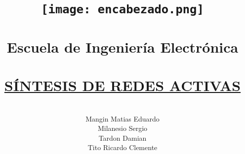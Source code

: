 \documentclass[]{article}
\title{\texttt{[image: encabezado.png]}\\
\textbf{\\Escuela de Ingeniería Electrónica}\\    
\textbf{\\\underline{SÍNTESIS DE REDES ACTIVAS}}\\
      }
\author{\\ 
Mangin Matias Eduardo\\
Milanesio Sergio\\
Tardon Damian\\
Tito Ricardo Clemente\\
}
\begin{document}
\maketitle

\begin{abstract}

\end{abstract}

\section{}
\end{document}
